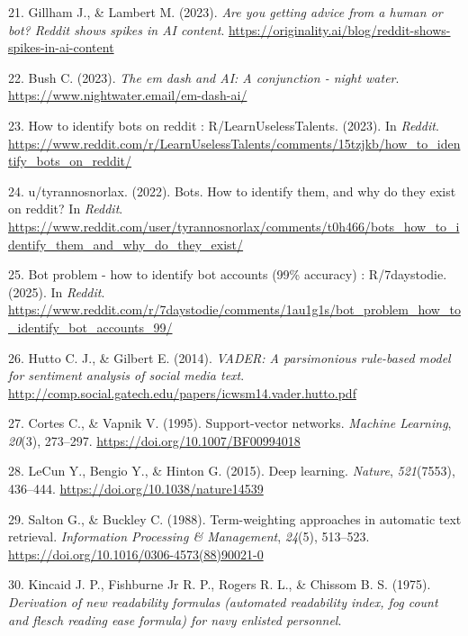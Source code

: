 \documentclass[
  12pt,
  letterpaper,
  DIV=11,
  numbers=noendperiod,
  abstract]{scrartcl}
\newlength{\cslhangindent}
\newenvironment{CSLReferences}[2] %
 {\begin{list}{}{%
  \setlength{\itemindent}{0pt}
  \setlength{\leftmargin}{0pt}
  \setlength{\parsep}{0pt}
  \ifodd #1
   \setlength{\leftmargin}{\cslhangindent}
   \setlength{\itemindent}{-1\cslhangindent}
  \fi
  \setlength{\itemsep}{#2\baselineskip}}}
 {\end{list}}
\begin{document}
\begin{CSLReferences}{1}{0}
21. Gillham J., \& Lambert M. (2023). \emph{Are you getting advice from
a human or bot? Reddit shows spikes in AI content}.
\url{https://originality.ai/blog/reddit-shows-spikes-in-ai-content}

22. Bush C. (2023). \emph{The em dash and AI: A conjunction - night
water}. \url{https://www.nightwater.email/em-dash-ai/}

23. How to identify bots on reddit : R/LearnUselessTalents. (2023). In
\emph{Reddit}.
\url{https://www.reddit.com/r/LearnUselessTalents/comments/15tzjkb/how_to_identify_bots_on_reddit/}

24. u/tyrannosnorlax. (2022). Bots. How to identify them, and why do
they exist on reddit? In \emph{Reddit}.
\url{https://www.reddit.com/user/tyrannosnorlax/comments/t0h466/bots_how_to_identify_them_and_why_do_they_exist/}

25. Bot problem - how to identify bot accounts (99\% accuracy) :
R/7daystodie. (2025). In \emph{Reddit}.
\url{https://www.reddit.com/r/7daystodie/comments/1au1g1s/bot_problem_how_to_identify_bot_accounts_99/}

26. Hutto C. J., \& Gilbert E. (2014). \emph{VADER: A parsimonious
rule-based model for sentiment analysis of social media text}.
\url{http://comp.social.gatech.edu/papers/icwsm14.vader.hutto.pdf}

27. Cortes C., \& Vapnik V. (1995). Support-vector networks.
\emph{Machine Learning}, \emph{20}(3), 273--297.
\url{https://doi.org/10.1007/BF00994018}

28. LeCun Y., Bengio Y., \& Hinton G. (2015). Deep learning.
\emph{Nature}, \emph{521}(7553), 436--444.
\url{https://doi.org/10.1038/nature14539}

29. Salton G., \& Buckley C. (1988). Term-weighting approaches in
automatic text retrieval. \emph{Information Processing \& Management},
\emph{24}(5), 513--523.
\url{https://doi.org/10.1016/0306-4573(88)90021-0}

30. Kincaid J. P., Fishburne Jr R. P., Rogers R. L., \& Chissom B. S.
(1975). \emph{Derivation of new readability formulas (automated
readability index, fog count and flesch reading ease formula) for navy
enlisted personnel}.

\end{CSLReferences}
\end{document}
